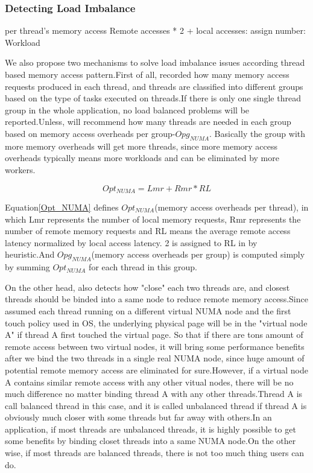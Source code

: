 \subsubsection{Detecting Load Imbalance}
per thread's memory access
Remote accesses * 2 + local accesses: 
assign number: 
Workload 


We also propose two mechanisms to solve load imbalance issues according thread based memory access pattern.First of all, \NP{} recorded how many memory access requests produced in each thread, and threads are classified into different groups based on the type of tasks executed on threads.If there is only one single thread group in the whole application, no load balanced problems will be reported.Unless, \NP{} will recommend how many threads are needed in each group based on memory access overheads per group-$Opg_{NUMA}$. Basically the group with more memory overheads will get more threads, since more memory access overheads typically means more workloads and can be eliminated by more workers.

\begin{equation}
Opt_{NUMA} = Lmr + Rmr * RL  \label{Opt_NUMA}
\end{equation}

Equation\ref{Opt_NUMA} defines $Opt_{NUMA}$(memory access overheads per thread), in which Lmr represents the number of local memory requests, Rmr represents the number of remote memory requests and RL means the average remote access latency normalized by local access latency. 2 is assigned to RL in \NP{} by heuristic.And $Opg_{NUMA}$(memory access overheads per group) is computed simply by summing $Opt_{NUMA}$ for each thread in this group.

On the other head, \NP{} also detects how "close" each two threads are, and closest threads should be binded into a same node to reduce remote memory access.Since \NP{} assumed each thread running on a different virtual NUMA node and the first touch policy used in OS, the underlying physical page will be in the "virtual node A" if thread A first touched the virtual page. So that if there are tons amount of remote access between two virtual nodes, it will bring some performance benefits after we bind the two threads in a single real NUMA node, since huge amount of potential remote memory access are eliminated for sure.However, if a virtual node A contains similar remote access with any other vitual nodes, there will be no much difference no matter binding thread A with any other threads.Thread A is call balanced thread in this case, and it is called unbalanced thread if thread A is obviously much closer with some threads but far away with others.In an application, if most threads are unbalanced threads, it is highly possible to get some benefits by binding closet threads into a same NUMA node.On the other wise, if most threads are balanced threads, there is not too much thing users can do.

